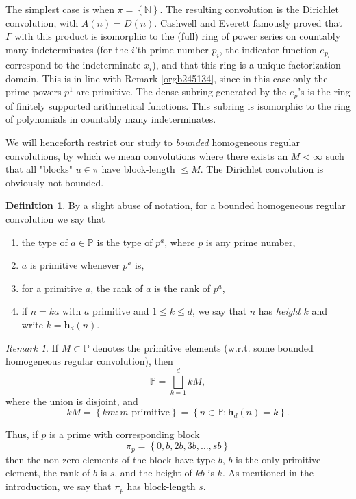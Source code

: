 \documentclass[12pt]{article}
\theoremstyle{definition}
\newtheorem{definition}{Definition}
\theoremstyle{remark}
\newtheorem{remark}{Remark}
\theoremstyle{plain}
\newcommand{\set}[1]{\left\{{#1}\right\}}
\newcommand\setsuchas[2]{\left\{{#1}:{#2}\right\}}
\newcommand{\NN}{{\mathbb{N}}}
\newcommand{\NNp}{{\mathbb{P}}}
\newcommand{\divisors}[1]{{D(#1)}}
\newcommand{\height}[2]{\mathbf{h}_{#1}(#2)}
\begin{document}
The simplest case is when \(\pi=\set{\NN}\).
The resulting convolution is the Dirichlet convolution, with \(A(n)=\divisors{n}\).
Cashwell and Everett \cite{NumThe} famously proved that \(\Gamma\) with this product
is isomorphic to the (full) ring of power series on countably many indeterminates
(for the \(i\)'th prime number \(p_{i}\), the indicator function \(e_{{p_{i}}}\) correspond to the indeterminate \(x_{i}\)), and
that this ring is a unique factorization domain. This is in line with
Remark \ref{orgb245134}, since in this case only the prime powers \(p^{1}\) are primitive.
The dense subring generated by the \(e_{p}\)'s is the ring of finitely supported arithmetical functions.
This subring is isomorphic to the ring of polynomials in countably many indeterminates.

We will henceforth restrict our study to \emph{bounded} homogeneous regular convolutions, by which
we mean convolutions where there exists an \(M < \infty\)
such that all "blocks" \(u \in \pi\) have block-length \(\le M\). The Dirichlet convolution is
obviously not bounded.

\begin{definition}
By a slight abuse of notation, for a bounded homogeneous regular convolution we say that
\begin{enumerate}[label={(\alph*)}]
\item the type of \(a \in \NNp\) is the type of \(p^{a}\), where \(p\) is any prime number,
\item \(a\) is primitive whenever \(p^{a}\) is,
\item for a primitive \(a\),  the rank of \(a\) is the rank of \(p^{a}\),
\item if \(n=ka\) with \(a\) primitive and \(1 \le k \le d\), we say that \(n\) has \emph{height} \(k\)  and write \(k=\height{d}{n}\).
\end{enumerate}
\label{org70b1361}
\end{definition}

\begin{remark}
If \(M \subset \NNp\) denotes the primitive elements (w.r.t. some bounded homogeneous regular convolution), then
\begin{equation}
\label{eq:orgb39f0db}
\NNp = \bigsqcup_{{k=1}}^{d} kM,
\end{equation}
where the union is disjoint, and
\[
kM = \setsuchas{km}{m \text{ primitive}} = \setsuchas{n \in \NNp}{\height{d}{n}=k}.\]

Thus, if \(p\) is a prime with corresponding block
\[
\pi_{p} = \set{0, b, 2b, 3b, \dots, sb}
\]
then the non-zero elements of the block have type \(b\),
\(b\) is the only primitive element,
the rank of \(b\) is \(s\),
and the height of \(kb\) is \(k\).
As mentioned in the introduction, we say that \(\pi_{p}\) has block-length \(s\).
\end{remark}
\end{document}
